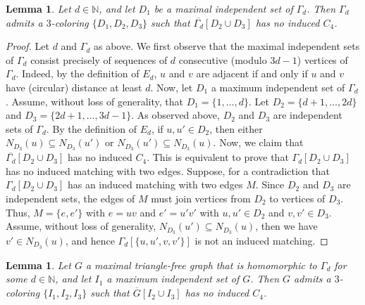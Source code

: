 \documentclass[a4paper,12pt]{article}
\newtheorem{lemma}[theorem]{Lemma}
\begin{document}

\begin{lemma}\label{lemma:andrasfai_coloring}
	Let \(d\in\mathbb{N}\),
	and let \(D_1\) be a maximal independent set of \(\Gamma_d\).
	Then \(\Gamma_d\) admits a \(3\)-coloring \(\{D_1,D_2,D_3\}\)
	such that \(\overline{\Gamma_d}[D_2\cup D_3]\) has no induced \(C_4\).
\end{lemma}

\begin{proof}
	Let \(d\) and \(\Gamma_d\) as above.
	We first observe that the maximal independent sets of \(\Gamma_d\)
	consist precisely of sequences of \(d\) consecutive (modulo \(3d-1\)) vertices of \(\Gamma_d\).
	Indeed,	by the definition of \(E_d\), \(u\) and \(v\) are adjacent 
	if and only if \(u\) and \(v\) have (circular) distance at least \(d\).
	Now, let \(D_1\) a maximum independent set of \(\Gamma_d\).
	Assume, without loss of generality, that \(D_1 = \{1,\ldots,d\}\).
	Let \(D_2 = \{d+1,\ldots,2d\}\) and \(D_3 = \{2d+1,\ldots, 3d-1\}\).
	As observed above, \(D_2\) and \(D_3\) are independent sets of \(\Gamma_d\).
	By the definition of \(E_d\), if \(u,u'\in D_2\),
	then either \(N_{D_3}(u) \subseteq N_{D_3}(u')\) or \(N_{D_3}(u') \subseteq N_{D_3}(u)\).
	Now, we claim that \(\overline{\Gamma_d}[D_2\cup D_3]\) has no induced \(C_4\).
	This is equivalent to prove that \(\Gamma_d[D_2\cup D_3]\) has no induced matching with two edges.
	Suppose, for a contradiction that \(\Gamma_d[D_2\cup D_3]\) has an induced matching with two edges \(M\).
	Since \(D_2\) and \(D_3\) are independent sets, the edges of \(M\) must join vertices from \(D_2\) to vertices of \(D_3\).
	Thus, \(M = \{e,e'\}\) with \(e = uv\) and \(e' = u'v'\) with \(u,u' \in D_2\) and \(v,v'\in D_3\).
	Assume, without loss of generality, \(N_{D_3}(u') \subseteq N_{D_3}(u)\),
	then we have \(v' \in N_{D_3}(u)\), and hence \(\Gamma_d[\{u,u',v,v'\}]\) is not an induced matching.
\end{proof}

\begin{lemma}\label{lemma:andrasfai_blowup_coloring}
	Let \(G\) a maximal triangle-free graph that is homomorphic to \(\Gamma_d\)
	for some \(d\in \mathbb{N}\),
	and let \(I_1\) a maximum independent set of \(G\).
	Then \(G\) admits a \(3\)-coloring \(\{I_1,I_2,I_3\}\)
	such that \(\overline{G}[I_2\cup I_3]\) has no induced \(C_4\).
\end{lemma}
\end{document}
